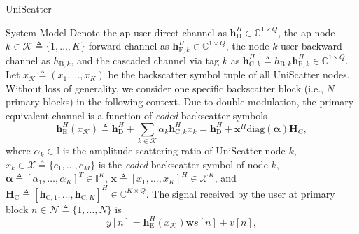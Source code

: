 \documentclass[journal]{IEEEtran}
\begin{document}
\begin{section}{UniScatter}
\begin{subsection}{System Model}
		Denote the \gls{ap}-user direct channel as $\boldsymbol{h}_{\mathrm{D}}^H \in \mathbb{C}^{1 \times Q}$, the \gls{ap}-node $k \in \mathcal{K} \triangleq \{1,\ldots,K\}$ forward channel as $\boldsymbol{h}_{\mathrm{F},k}^H \in \mathbb{C}^{1 \times Q}$, the node $k$-user backward channel as $h_{\mathrm{B},k}$, and the cascaded channel via tag $k$ as $\boldsymbol{h}_{\mathrm{C},k}^H \triangleq h_{\mathrm{B},k} \boldsymbol{h}_{\mathrm{F},k}^H \in \mathbb{C}^{1 \times Q}$.
		Let $x_{\mathcal{K}} \triangleq (x_1,\ldots,x_K)$ be the backscatter symbol tuple of all UniScatter nodes.
		Without loss of generality, we consider one specific backscatter block (i.e., $N$ primary blocks) in the following context.
		Due to double modulation, the primary equivalent channel is a function of \emph{coded} backscatter symbols
		\begin{equation}
			\boldsymbol{h}_{\mathrm{E}}^H(x_{\mathcal{K}}) \triangleq \boldsymbol{h}_{\mathrm{D}}^H + \sum_{k \in \mathcal{K}} \alpha_k \boldsymbol{h}_{\mathrm{C},k}^H x_k = \boldsymbol{h}_{\mathrm{D}}^H + \boldsymbol{x}^H \mathrm{diag}(\boldsymbol{\alpha}) \boldsymbol{H}_{\mathrm{C}},
			\label{eq:equivalent_channel}
		\end{equation}
		where $\alpha_k \in \mathbb{I}$ is the amplitude scattering ratio of UniScatter node $k$, $x_k \in \mathcal{X} \triangleq \{c_1,\ldots,c_M\}$ is the \emph{coded} backscatter symbol of node $k$, $\boldsymbol{\alpha} \triangleq [\alpha_1,\ldots,\alpha_K]^T \in \mathbb{I}^{K}$, $\boldsymbol{x} \triangleq [x_1,\ldots,x_K]^H \in \mathcal{X}^{K}$, and $\boldsymbol{H}_{\mathrm{C}} \triangleq [\boldsymbol{h}_{\mathrm{C},1},\ldots,\boldsymbol{h}_{\mathrm{C},K}]^H \in \mathbb{C}^{K \times Q}$. The signal received by the user at primary block $n \in \mathcal{N} \triangleq \{1,\ldots,N\}$ is
		\begin{equation}
			y[n] = \boldsymbol{h}_{\mathrm{E}}^H(x_{\mathcal{K}}) \boldsymbol{w} s[n] + v[n],

\end{equation}
\end{subsection}
\end{section}
\end{document}
